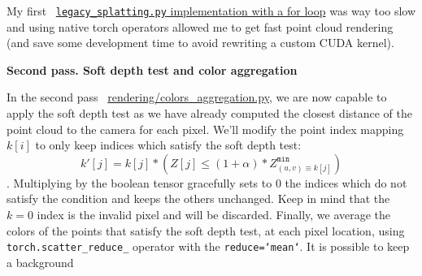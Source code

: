 My first ~\href{https://github.com/balthazarneveu/per-pixel-point-rendering/blob/main/src/pixr/rendering/legacy\_splatting.py}{\texttt{legacy\_splatting.py} implementation with a for loop} was way too slow and using native torch operators allowed me to get fast point cloud rendering (and save some development time to avoid rewriting a custom CUDA kernel).

\noindent \textbf{Second pass. Soft depth test and color aggregation}

In the second pass  ~\href{https://github.com/balthazarneveu/per-pixel-point-rendering/blob/main/src/pixr/rendering/colors\_aggregation.py}{rendering/colors\_aggregation.py}, we are now capable to apply the soft depth test as we have already computed the closest distance of the point cloud to the camera for each pixel. We'll modify the point index mapping $k[i]$ to only keep indices which satisfy the soft depth test: 
$$ k'[j] = k[j] * \left(Z[j] \leq (1+\alpha) *Z^{\texttt{min}}_{(u,v) \equiv k[j]}\right)$$.
Multiplying by the boolean tensor gracefully sets to 0 the indices which do not satisfy the condition and keeps the others unchanged. Keep in mind that the $k=0$ index is the invalid pixel and will be discarded.
Finally, we average the colors of the points that satisfy the soft depth test, at each pixel location, using \texttt{torch.scatter\_reduce\_} operator with the \texttt{reduce=`mean`}. It is possible to keep a background

